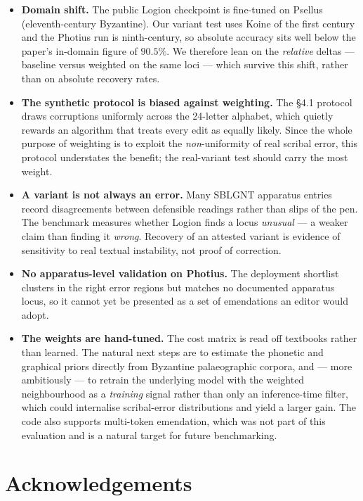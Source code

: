 \documentclass[11pt]{article}
\begin{document}
\begin{itemize}
  \item \textbf{Domain shift.} The public Logion checkpoint is fine-tuned on
  Psellus (eleventh-century Byzantine). Our variant test uses Koine of the first
  century and the Photius run is ninth-century, so absolute accuracy sits well
  below the paper's in-domain figure of $90.5\%$. We therefore lean on the
  \emph{relative} deltas --- baseline versus weighted on the same loci --- which
  survive this shift, rather than on absolute recovery rates.
  \item \textbf{The synthetic protocol is biased against weighting.} The \S4.1
  protocol draws corruptions uniformly across the 24-letter alphabet, which
  quietly rewards an algorithm that treats every edit as equally likely. Since the
  whole purpose of weighting is to exploit the \emph{non}-uniformity of real
  scribal error, this protocol understates the benefit; the real-variant test
  should carry the most weight.
  \item \textbf{A variant is not always an error.} Many SBLGNT apparatus entries
  record disagreements between defensible readings rather than slips of the pen.
  The benchmark measures whether Logion finds a locus \emph{unusual} --- a
  weaker claim than finding it \emph{wrong}. Recovery of an attested variant is
  evidence of sensitivity to real textual instability, not proof of correction.
  \item \textbf{No apparatus-level validation on Photius.} The deployment
  shortlist clusters in the right error regions but matches no documented
  apparatus locus, so it cannot yet be presented as a set of emendations an editor
  would adopt.
  \item \textbf{The weights are hand-tuned.} The cost matrix is read off textbooks
  rather than learned. The natural next steps are to estimate the phonetic and
  graphical priors directly from Byzantine palaeographic corpora, and --- more
  ambitiously --- to retrain the underlying model with the weighted neighbourhood
  as a \emph{training} signal rather than only an inference-time filter, which
  could internalise scribal-error distributions and yield a larger gain. The code
  also supports multi-token emendation, which was not part of this evaluation and
  is a natural target for future benchmarking.
\end{itemize}

\section*{Acknowledgements}
\end{document}
